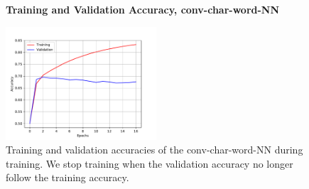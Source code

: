 \begin{figure}
    \centering
    \textbf{Training and Validation Accuracy, \gls{conv-char-word-NN}}\par\medskip
    \includegraphics[width=0.5\textwidth]{./pictures/experiments/conv_char_word_nn/training}
    \caption{Training and validation accuracies of the \gls{conv-char-word-NN}
        during training. We stop training when the validation accuracy no longer
        follow the training accuracy.}
    \label{fig:conv-char-word-NN-training}
\end{figure}

